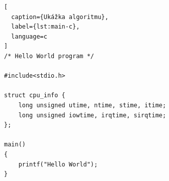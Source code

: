 \begin{lstlisting}[
  caption={Ukážka algoritmu},
  label={lst:main-c},
  language=c
]
/* Hello World program */

#include<stdio.h>

struct cpu_info {
    long unsigned utime, ntime, stime, itime;
    long unsigned iowtime, irqtime, sirqtime;
};

main()
{
    printf("Hello World");
}
\end{lstlisting}